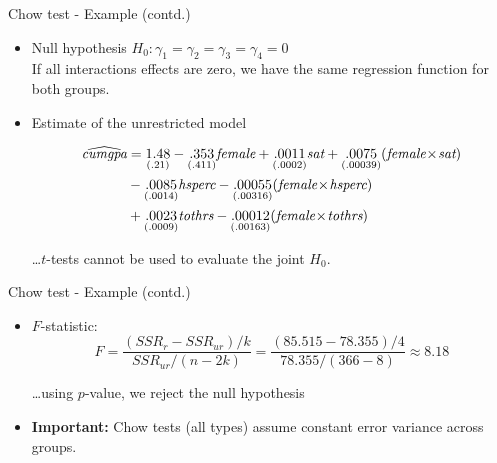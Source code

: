 \documentclass{beamer}
\begin{document}
\begin{frame}{Chow test - Example (contd.) }
\begin{itemize}
\item Null hypothesis
\vspace{0.3cm}
$H_0 : \gamma_1 = \gamma_2 = \gamma_3 = \gamma_4 = 0$ \\
If all interactions effects are zero, we have the same regression function for both groups.
\vspace{0.3cm}
\item Estimate of the unrestricted model

\begin{equation} \notag 
\begin{aligned}
\widehat{\textit{cumgpa}} &= \underset{(.21)}{1.48} - \underset{(.411)}{.353} \textit{female} + \underset{(.0002)}{.0011} \textit{sat} + \underset{(.00039)}{.0075}(\textit{female} \! \times \! \textit{sat} ) 
\\&- \underset{(.0014)}{.0085} \textit{hsperc} - \underset{(.00316)}{.00055} (\textit{female} \! \times \! \textit{hsperc} ) 
\\&+  \underset{(.0009)}{.0023} \textit{tothrs} - \underset{(.00163)}{.00012} (\textit{female} \! \times \! \textit{tothrs} )
\end{aligned}
\end{equation}

\dots $t$-tests cannot be used to evaluate the joint $H_0$. 
\end{itemize}
\end{frame}


\begin{frame}{Chow test - Example (contd.)}
\begin{itemize}
\item $F$-statistic:
$$F= \frac{(\textit{SSR}_r - \textit{SSR}_{\textit{ur}})/k}{\textit{SSR}_{\textit{ur}}/(n-2k)}=\frac{(85.515 - 78.355)/4}{78.355/(366-8)}\approx8.18$$

\dots using $p$-value, we reject the null hypothesis \\
\vspace{3cm}
\item \textbf{Important:} Chow tests (all types) assume constant error variance across groups.

\end{itemize}
\end{frame}
\end{document}
